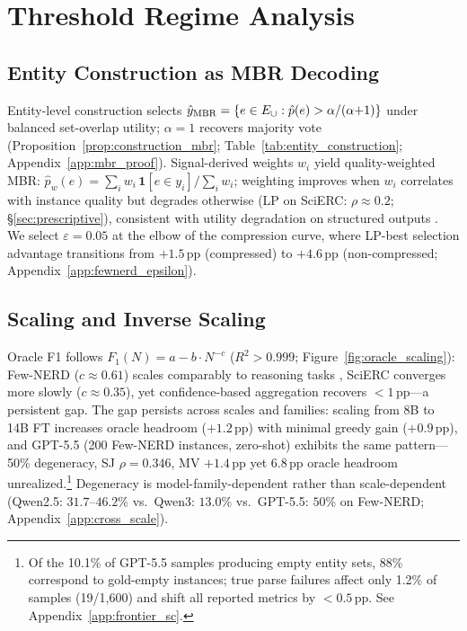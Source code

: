 \section{Threshold Regime Analysis}\label{sec:theory_scaling}

\subsection{Entity Construction as MBR Decoding}\label{sec:mbr_theory}

Entity-level construction selects $\hat{y}_{\textup{MBR}} = \{e \in E_\cup : \hat{p}(e) > \alpha/(\alpha{+}1)\}$ under balanced set-overlap utility; $\alpha{=}1$ recovers majority vote (Proposition~\ref{prop:construction_mbr}; Table~\ref{tab:entity_construction}; Appendix~\ref{app:mbr_proof}).
Signal-derived weights $w_i$ yield quality-weighted MBR: $\hat{p}_w(e) = \sum_{i} w_i \, \mathbf{1}[e {\in} y_i] / \sum_{i} w_i$; weighting improves when $w_i$ correlates with instance quality but degrades otherwise (LP on SciERC: $\rho{\approx}0.2$; \S\ref{sec:prescriptive}), consistent with utility degradation on structured outputs \cite{eikema2025structured}.
We select $\varepsilon{=}0.05$ at the elbow of the compression curve, where LP-best selection advantage transitions from $+1.5$\,pp (compressed) to $+4.6$\,pp (non-compressed; Appendix~\ref{app:fewnerd_epsilon}).

\subsection{Scaling and Inverse Scaling}\label{sec:scaling}

Oracle F1 follows $F_1(N) = a - b \cdot N^{-c}$ ($R^2 > 0.999$; Figure~\ref{fig:oracle_scaling}): Few-NERD ($c{\approx}0.61$) scales comparably to reasoning tasks \cite{brown2024monkeys}, SciERC converges more slowly ($c{\approx}0.35$), yet confidence-based aggregation recovers ${<}1$\,pp---a persistent gap.
The gap persists across scales and families: scaling from 8B to 14B FT increases oracle headroom ($+1.2$\,pp) with minimal greedy gain ($+0.9$\,pp), and GPT-5.5 (200 Few-NERD instances, zero-shot) exhibits the same pattern---50\% degeneracy, SJ $\rho{=}0.346$, MV $+1.4$\,pp yet 6.8\,pp oracle headroom unrealized.\footnote{Of the 10.1\% of GPT-5.5 samples producing empty entity sets, 88\% correspond to gold-empty instances; true parse failures affect only 1.2\% of samples (19/1{,}600) and shift all reported metrics by ${<}0.5$\,pp. See Appendix~\ref{app:frontier_sc}.}
Degeneracy is model-family-dependent rather than scale-dependent (Qwen2.5: $31.7$--$46.2$\% vs.\ Qwen3: $13.0$\% vs.\ GPT-5.5: $50$\% on Few-NERD; Appendix~\ref{app:cross_scale}).

